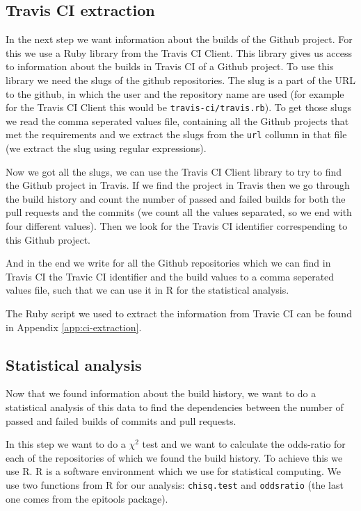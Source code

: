 \documentclass[a4paper,11pt]{article}
\begin{document}
		\subsection{Travis CI extraction}
			In the next step we want information about the builds of the Github project.
			For this we use a Ruby library from the Travis CI Client\cite{travis.rb}.
			This library gives us access to information about the builds in Travis CI of a Github project.
			To use this library we need the slugs of the github repositories.
			The slug is a part of the URL to the github, in which the user and the repository name are used (for example for the
			Travis CI Client this would be \texttt{travis-ci/travis.rb}).
			To get those slugs we read the comma seperated values file, containing all the Github projects that met the
			requirements and we extract the slugs from the \texttt{url} collumn in that file (we extract the slug using regular
			expressions).
			
			Now we got all the slugs, we can use the Travis CI Client library to try to find the Github project in Travis.
			If we find the project in Travis then we go through the build history and count the number of passed and failed
			builds for both the pull requests and the commits (we count all the values separated, so we end with four different
			values).
			Then we look for the Travis CI identifier correspending to this Github project.
			
			And in the end we write for all the Github repositories which we can find in Travis CI the Travic CI identifier and
			the build values to a comma seperated values file, such that we can use it in R for the statistical analysis.
			
			The Ruby script we used to extract the information from Travic CI can be found in Appendix \ref{app:ci-extraction}.
	
		\subsection{Statistical analysis}
			Now that we found information about the build history, we want to do a statistical analysis of this data to find
			the dependencies between the number of passed and failed builds of commits and pull requests.
			
			In this step we want to do a $\chi^2$ test and we want to calculate the odds-ratio for each of the repositories of
			which we found the build history.
			To achieve this we use R\cite{r}.
			R is a software environment which we use for statistical computing.
			We use two functions from R for our analysis: 
			\texttt{chisq.test} and \texttt{oddsratio} (the last one comes from the epitools package).
			
\end{document}
